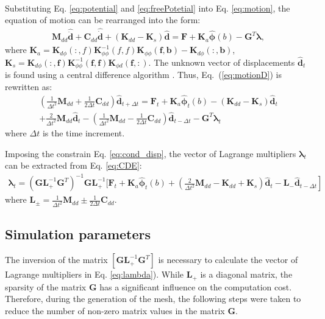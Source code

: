 \documentclass[a4paper,12pt]{article}
\begin{document}
{\begin{eqnarray}
\label{eq:freePotetial}
\end{eqnarray}
Substituting Eq. \ref{eq:potential} and \ref{eq:freePotetial} into Eq. \ref{eq:motion}, the equation of motion can be rearranged into the form:
\begin{eqnarray}
\textbf{M}_{dd} \widehat{\ddot{\textbf{d}}} + \textbf{C}_{dd} \widehat{\dot{\textbf{d}}} + (\textbf{K}_{dd}-\textbf{K}_{s}) \widehat{\textbf{d}}  = \textbf{F} + \textbf{K}_{a} \widehat{\boldsymbol{\phi}}(b) - \textbf{G}^T \boldsymbol{\lambda},
\label{eq:motionD}
\end{eqnarray}
where  \(\textbf{K}_a=\textbf{K}_{d\phi}(:,f)\textbf{K}_{\phi \phi}^{-1}(f,f)\textbf{K}_{\phi \phi}(\textbf{f},\textbf{b})-\textbf{K}_{d\phi}(:,\textbf{b})\), \(\textbf{K}_s=\textbf{K}_{d \phi}(:,\textbf{f})\textbf{K}_{\phi \phi}^{-1}(\textbf{f},\textbf{f})\textbf{K}_{\phi d}(\textbf{f},:)\).
The unknown vector of displacements \(\widehat{\textbf{d}}_t\) is found using a central difference algorithm \cite{kudela20093d}.
Thus, Eq.~(\ref{eq:motionD}) is rewritten as:
\begin{eqnarray}
\left(\frac{1}{\Delta t^2}\textbf{M}_{dd}+\frac{1}{2\Delta t}\textbf{C}_{dd} \right)\widehat{\textbf{d}}_{t+\Delta t}=
\textbf{F}_t+\textbf{K}_a\widehat{\boldsymbol{\phi}}_t(b)-\left( \textbf{K}_{dd}-\textbf{K}_s\right)\widehat{\textbf{d}}_t\nonumber\\
+\frac{2}{\Delta t^2}\textbf{M}_{dd}\widehat{\textbf{d}}_t-\left(\frac{1}{\Delta t^2}\textbf{M}_{dd}-\frac{1}{2\Delta t}\textbf{C}_{dd}\right)\widehat{\textbf{d}}_{t-\Delta t}-\textbf{G}^T\boldsymbol{\lambda}_t
\label{eq:CDE}
\end{eqnarray}
where \(\Delta t\) is the time increment.

Imposing the constrain Eq. \ref{eq:cond_disp}, the vector of Lagrange multipliers \(\boldsymbol{\lambda}_t\) can be extracted from Eq. \ref{eq:CDE}:\begin{eqnarray}
\boldsymbol{\lambda}_t = {\left(\textbf{G}\textbf{L}_+^{-1}\textbf{G}^T \right)}^{-1}\textbf{G}\textbf{L}_+^{-1} \Bigg[ \textbf{F}_t+\textbf{K}_a\widehat{\boldsymbol{\phi}}_t(b)+\left.\left(\frac{2}{\Delta t^2}\textbf{M}_{dd}-\textbf{K}_{dd}+\textbf{K}_s\right)\widehat{\textbf{d}}_t -\textbf{L}_-\widehat{\textbf{d}}_{t-\Delta t} \right]
\label{eq:lambda}
\end{eqnarray}
where \(\textbf{L}_{\pm}=\frac{1}{\Delta t^2}\textbf{M}_{dd}\pm\frac{1}{2\Delta t}\textbf{C}_{dd}\).

\subsection{Simulation parameters}
\label{sec:simulation}
The inversion of the matrix \(\left [\textbf{GL}_+^{-1}\textbf{G}^T\right ]\) is necessary to calculate the vector of Lagrange multipliers in Eq. \ref{eq:lambda}).
While \(\textbf{L}_+\) is a diagonal matrix, the sparsity of the matrix \(\textbf{G}\) has a significant influence on the computation cost.
Therefore, during the generation of the mesh, the following steps were taken to reduce the number of non-zero matrix values in the matrix \(\textbf{G}\).

}
\end{document}
